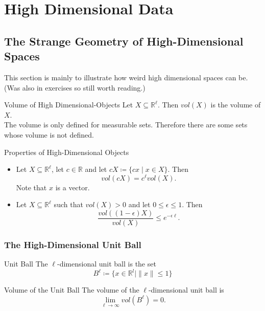 \documentclass{panikzettel}
\begin{document}
\section{High Dimensional Data}
\subsection{The Strange Geometry of High-Dimensional Spaces}
This section is mainly to illustrate how weird high dimensional spaces can be. (Was also in exercises so still worth reading.)

\begin{halfboxl}
\vspace{-\baselineskip}
	\begin{defi}{Volume of High Dimensional-Objects}
	Let $X\subseteq \mathbb{R}^\ell$. Then $vol(X)$ is the volume of $X$.\\
	The volume is only defined for measurable sets. Therefore there are some sets whose volume is not defined.
	\end{defi}
\end{halfboxl}
\begin{halfboxr}
\vspace{-\baselineskip}
	\begin{theo}{Properties of High-Dimensional Objects}
	\begin{itemize}
	\item Let $X\subseteq \mathbb{R}^\ell$, let $c\in\mathbb{R}$ and let $cX\coloneqq \{cx\mid x\in X \}$. Then
	\[
	vol(cX)=c^\ell vol(X).
	\]
	Note that $x$ is a vector.
	\item Let $X\subseteq \mathbb{R}^\ell$ such that $vol(X)>0$ and let $0\leq \epsilon\leq 1$. Then
	\[
	\frac{vol((1-\epsilon)X)}{vol(X)}\leq e^{-\epsilon\ell}.
	\]
	\end{itemize}
	\end{theo}
\end{halfboxr}

\subsubsection{The High-Dimensional Unit Ball}
\begin{halfboxl}
\vspace{-\baselineskip}
	\begin{defi}{Unit Ball}
	The $\ell$-dimensional unit ball is the set
	\[
	B^\ell \coloneqq \{x\in\mathbb{R}^l \mid \parallel x \parallel \leq 1 \}
	\]
	\end{defi}
\end{halfboxl}
\begin{halfboxr}
	\vspace{-\baselineskip}
	\begin{theo}{Volume of the Unit Ball}
	The volume of the $\ell$-dimensional unit ball is
	\[
	\lim_{\ell \to \infty} vol(B^\ell) = 0.
	\]
	\end{theo}
\end{halfboxr}
\end{document}
